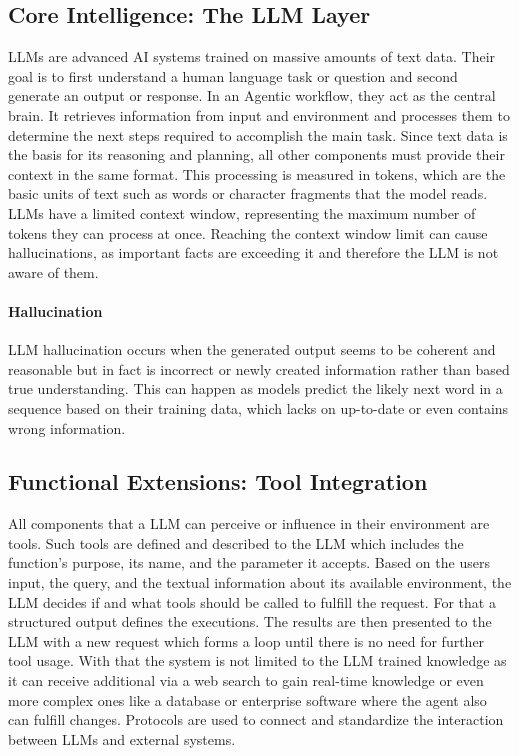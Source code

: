 \documentclass[10pt,twocolumn,letterpaper]{article}
\begin{document}
\subsection{Core Intelligence: The LLM Layer}
\label{sec:background_llms}
LLMs are advanced AI systems trained on massive amounts of text data. Their goal is to first understand a human language task or question and second generate an output or response. In an Agentic workflow, they act as the central brain. It retrieves information from input and environment and processes them to determine the next steps required to accomplish the main task. Since text data is the basis for its reasoning and planning, all other components must provide their context in the same format. This processing is measured in tokens, which are the basic units of text such as words or character fragments that the model reads. LLMs have a limited context window, representing the maximum number of tokens they can process at once. Reaching the context window limit can cause hallucinations, as important facts are exceeding it and therefore the LLM is not aware of them.
\paragraph{Hallucination}

LLM hallucination occurs when the generated output seems to be coherent and reasonable but in fact is incorrect or newly created information rather than based true understanding. This can happen as models predict the likely next word in a sequence based on their training data, which lacks on up-to-date or even contains wrong information.

\subsection{Functional Extensions: Tool Integration}
All components that a LLM can perceive or influence in their environment are tools. Such tools are defined and described to the LLM which includes the function's purpose, its name, and the parameter it accepts. Based on the users input, the query, and the textual information about its available environment, the LLM decides if and what tools should be called to fulfill the request. For that a structured output defines the executions. The results are then presented to the LLM with a new request which forms a loop until there is no need for further tool usage. With that the system is not limited to the LLM trained knowledge as it can receive additional via a web search to gain real-time knowledge or even more complex ones like a database or enterprise software where the agent also can fulfill changes. Protocols are used to connect and standardize the interaction between LLMs and external systems. 
\end{document}
